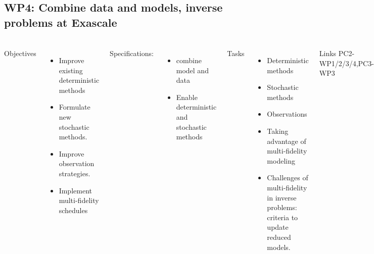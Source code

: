 \subsection{WP4: Combine data and models, inverse problems at Exascale }
\begin{frame}
  \frametitle{\insertsectionhead}
  \framesubtitle{\insertsubsectionhead}
  \begin{columns}[t]
    Objectives
    \begin{itemize}
      \item Improve existing deterministic methods 
      \item  Formulate new stochastic methods. 
      \item Improve observation strategies.
      \item Implement multi-fidelity schedules  
    \end{itemize}
    Specifications:
    \begin{itemize}
      \item combine model and data 
      \item Enable deterministic and stochastic methods
    \end{itemize}
    Tasks
    \begin{itemize}
      \item Deterministic methods
      \item Stochastic methods
      \item Observations
      \item Taking advantage of multi-fidelity modeling
      \item Challenges of multi-fidelity in inverse problems: criteria to update reduced models.
    \end{itemize}
    \begin{alertblock}{Links}
    PC2-WP1/2/3/4,PC3-WP3
  \end{alertblock}
  \end{columns}
\end{frame}

